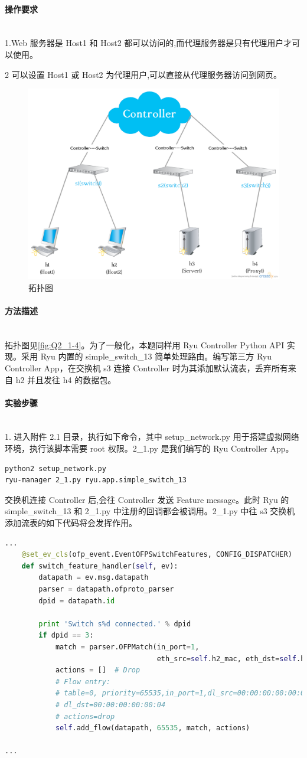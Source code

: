 \documentclass[format=draft,language=chinese,category=SDN]{hustreport}
\newcommand{\myparagraph}[1]{\paragraph{#1}\mbox{}\\}
\begin{document}
\myparagraph{操作要求}
1.Web 服务器是 Host1 和 Host2 都可以访问的,而代理服务器是只有代理用户才可以使用。

2 可以设置 Host1 或 Host2 为代理用户,可以直接从代理服务器访问到网页。

\begin{figure}[!h]
\centering
\includegraphics[width=.618\textwidth]{fig/2_1-4.png}
\caption{拓扑图}\label{fig:Q2_1-4}
\end{figure}

\myparagraph{方法描述}
拓扑图见\autoref{fig:Q2_1-4}。为了一般化，本题同样用 Ryu Controller Python API 实现。采用 Ryu 内置的 simple\_switch\_13 简单处理路由。编写第三方 Ryu Controller App，在交换机 s3 连接 Controller 时为其添加默认流表，丢弃所有来自 h2 并且发往 h4 的数据包。

\myparagraph{实验步骤}
1. 进入附件 2.1 目录，执行如下命令，其中 setup\_network.py 用于搭建虚拟网络环境，执行该脚本需要 root 权限。2\_1.py 是我们编写的 Ryu Controller App。

\begin{lstlisting}
python2 setup_network.py
ryu-manager 2_1.py ryu.app.simple_switch_13
\end{lstlisting}

交换机连接 Controller 后,会往 Controller 发送 Feature message。此时 Ryu 的 simple\_switch\_13 和 2\_1.py 中注册的回调都会被调用。2\_1.py 中往 s3 交换机添加流表的如下代码将会发挥作用。

\begin{lstlisting}[language=python]
...
    @set_ev_cls(ofp_event.EventOFPSwitchFeatures, CONFIG_DISPATCHER)
    def switch_feature_handler(self, ev):
        datapath = ev.msg.datapath
        parser = datapath.ofproto_parser
        dpid = datapath.id

        print 'Switch s%d connected.' % dpid
        if dpid == 3:
            match = parser.OFPMatch(in_port=1,
                                    eth_src=self.h2_mac, eth_dst=self.h4_mac)
            actions = []  # Drop
            # Flow entry:
            # table=0, priority=65535,in_port=1,dl_src=00:00:00:00:00:02,
            # dl_dst=00:00:00:00:00:04
            # actions=drop
            self.add_flow(datapath, 65535, match, actions)

...
\end{lstlisting}
\end{document}
